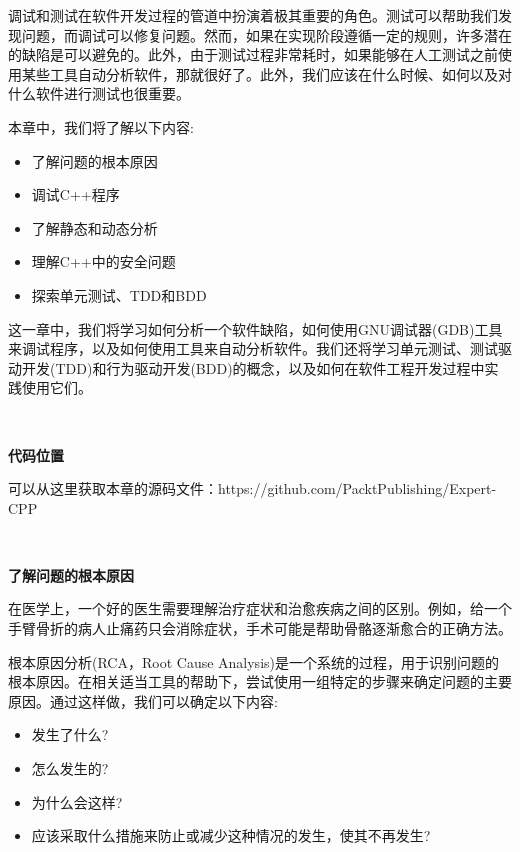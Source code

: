 调试和测试在软件开发过程的管道中扮演着极其重要的角色。测试可以帮助我们发现问题，而调试可以修复问题。然而，如果在实现阶段遵循一定的规则，许多潜在的缺陷是可以避免的。此外，由于测试过程非常耗时，如果能够在人工测试之前使用某些工具自动分析软件，那就很好了。此外，我们应该在什么时候、如何以及对什么软件进行测试也很重要。 \par

本章中，我们将了解以下内容: \par

\begin{itemize}
	\item 了解问题的根本原因
	\item 调试C++程序
	\item 了解静态和动态分析
	\item 理解C++中的安全问题
	\item 探索单元测试、TDD和BDD
\end{itemize}

这一章中，我们将学习如何分析一个软件缺陷，如何使用GNU调试器(GDB)工具来调试程序，以及如何使用工具来自动分析软件。我们还将学习单元测试、测试驱动开发(TDD)和行为驱动开发(BDD)的概念，以及如何在软件工程开发过程中实践使用它们。 \par

\noindent\textbf{}\ \par
\textbf{代码位置} \ \par
可以从这里获取本章的源码文件：https:/​/github.​com/PacktPublishing/Expert-CPP \par

\noindent\textbf{}\ \par
\textbf{了解问题的根本原因} \ \par
在医学上，一个好的医生需要理解治疗症状和治愈疾病之间的区别。例如，给一个手臂骨折的病人止痛药只会消除症状，手术可能是帮助骨骼逐渐愈合的正确方法。 \par
根本原因分析(RCA，Root Cause Analysis)是一个系统的过程，用于识别问题的根本原因。在相关适当工具的帮助下，尝试使用一组特定的步骤来确定问题的主要原因。通过这样做，我们可以确定以下内容: \par

\begin{itemize}
	\item 发生了什么?
	\item 怎么发生的?
	\item 为什么会这样?
	\item 应该采取什么措施来防止或减少这种情况的发生，使其不再发生?
\end{itemize}

